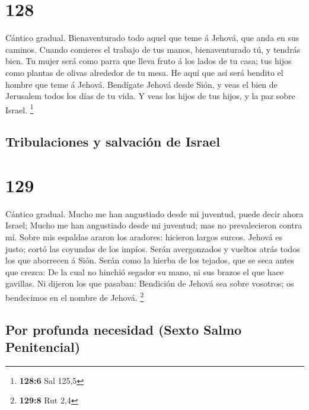\hypertarget{section-127}{%
\section{128}\label{section-127}}

 Cántico gradual. Bienaventurado todo aquel que teme á
Jehová, que anda en sus caminos.  Cuando comieres el trabajo
de tus manos, bienaventurado tú, y tendrás bien.  Tu mujer
será como parra que lleva fruto á los lados de tu casa; tus hijos como
plantas de olivas alrededor de tu mesa.  He aquí que así
será bendito el hombre que teme á Jehová.  Bendígate Jehová
desde Sión, y veas el bien de Jerusalem todos los días de tu vida.
 Y veas los hijos de tus hijos, y la paz sobre Israel.
\footnote{\textbf{128:6} Sal 125,5}

\hypertarget{tribulaciones-y-salvaciuxf3n-de-israel}{%
\subsection{Tribulaciones y salvación de
Israel}\label{tribulaciones-y-salvaciuxf3n-de-israel}}

\hypertarget{section-128}{%
\section{129}\label{section-128}}

 Cántico gradual. Mucho me han angustiado desde mi juventud,
puede decir ahora Israel;  Mucho me han angustiado desde mi
juventud; mas no prevalecieron contra mí.  Sobre mis
espaldas araron los aradores: hicieron largos surcos. 
Jehová es justo; cortó las coyundas de los impíos.  Serán
avergonzados y vueltos atrás todos los que aborrecen á Sión.
 Serán como la hierba de los tejados, que se seca antes que
crezca:  De la cual no hinchió segador su mano, ni sus
brazos el que hace gavillas.  Ni dijeron los que pasaban:
Bendición de Jehová sea sobre vosotros; os bendecimos en el nombre de
Jehová. \footnote{\textbf{129:8} Rut 2,4}

\hypertarget{por-profunda-necesidad-sexto-salmo-penitencial}{%
\subsection{Por profunda necesidad (Sexto Salmo
Penitencial)}\label{por-profunda-necesidad-sexto-salmo-penitencial}}

